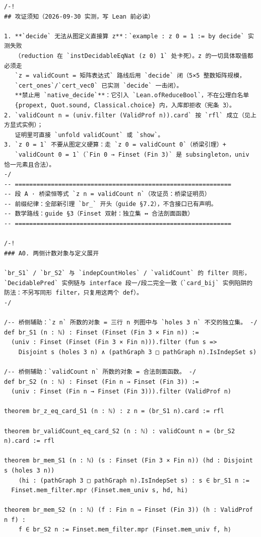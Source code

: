 \documentclass[11pt]{article}
\begin{document}
\begin{lstlisting}
/-!
## 攻证须知（2026-09-30 实测，写 Lean 前必读）

1. **`decide` 无法从图定义直接算 z**：`example : z 0 = 1 := by decide` 实测失败
   （reduction 在 `instDecidableEqNat (z 0) 1` 处卡死）。z 的一切具体取值都必须走
   `z = validCount = 矩阵表达式` 路线后用 `decide` 闭（5×5 整数矩阵规模，
   `cert_ones`/`cert_vec0` 已实测 `decide` 一击闭）。
   **禁止用 `native_decide`**：它引入 `Lean.ofReduceBool`，不在公理白名单
   {propext, Quot.sound, Classical.choice} 内，入库即拒收（宪条 3）。
2. `validCount n = (univ.filter (ValidProf n)).card` 按 `rfl` 成立（见上方显式实例）；
   证明里可直接 `unfold validCount` 或 `show`。
3. `z 0 = 1` 不要从图定义硬算：走 `z 0 = validCount 0`（桥梁引理）+
   `validCount 0 = 1`（`Fin 0 → Finset (Fin 3)` 是 subsingleton，univ 恰一元素且合法）。
-/
-- ============================================================
-- 段 A · 桥梁恒等式 `z n = validCount n`（攻证员：桥梁证明员）
-- 前缀纪律：全部新引理 `br_` 开头（guide §7.2），不含接口已有声明。
-- 数学路线：guide §3（Finset 双射：独立集 ↔ 合法剖面函数）
-- ============================================================

/-!
### A0. 两侧计数对象与定义展开

`br_S1` / `br_S2` 与 `indepCountHoles` / `validCount` 的 filter 同形，
`DecidablePred` 实例链与 interface 段一/段二完全一致（`card_bij` 实例陷阱的
防法：不另写同形 filter，只复用这两个 def）。
-/

/-- 桥侧辅助：`z n` 所数的对象 = 三行 n 列图中与 `holes 3 n` 不交的独立集。 -/
def br_S1 (n : ℕ) : Finset (Finset (Fin 3 × Fin n)) :=
  (univ : Finset (Finset (Fin 3 × Fin n))).filter (fun s =>
    Disjoint s (holes 3 n) ∧ (pathGraph 3 □ pathGraph n).IsIndepSet s)

/-- 桥侧辅助：`validCount n` 所数的对象 = 合法剖面函数。 -/
def br_S2 (n : ℕ) : Finset (Fin n → Finset (Fin 3)) :=
  (univ : Finset (Fin n → Finset (Fin 3))).filter (ValidProf n)

theorem br_z_eq_card_S1 (n : ℕ) : z n = (br_S1 n).card := rfl

theorem br_validCount_eq_card_S2 (n : ℕ) : validCount n = (br_S2 n).card := rfl

theorem br_mem_S1 (n : ℕ) (s : Finset (Fin 3 × Fin n)) (hd : Disjoint s (holes 3 n))
    (hi : (pathGraph 3 □ pathGraph n).IsIndepSet s) : s ∈ br_S1 n :=
  Finset.mem_filter.mpr ⟨Finset.mem_univ s, hd, hi⟩

theorem br_mem_S2 (n : ℕ) (f : Fin n → Finset (Fin 3)) (h : ValidProf n f) :
    f ∈ br_S2 n := Finset.mem_filter.mpr ⟨Finset.mem_univ f, h⟩


\end{lstlisting}
\end{document}
